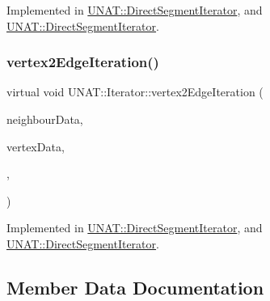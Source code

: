 Implemented in \mbox{\hyperlink{classUNAT_1_1DirectSegmentIterator_a6f53d346ec280ecfc3acf82691f6eaea}{U\+N\+A\+T\+::\+Direct\+Segment\+Iterator}}, and \mbox{\hyperlink{classUNAT_1_1DirectSegmentIterator_ac802bc1237356604a14c3349d6bf8d29}{U\+N\+A\+T\+::\+Direct\+Segment\+Iterator}}.

\mbox{\label{classUNAT_1_1Iterator_a0bb9f9c408c19b3c6bb342d37b333a1c}} 
\subsubsection{\texorpdfstring{vertex2EdgeIteration()}{vertex2EdgeIteration()}\hspace{0.1cm}{\footnotesize\ttfamily [2/2]}}
{\footnotesize\ttfamily virtual void U\+N\+A\+T\+::\+Iterator\+::vertex2\+Edge\+Iteration (\begin{DoxyParamCaption}\item[{\mbox{\hyperlink{structArrays}{Arrays}} $\ast$}]{neighbour\+Data,  }\item[{\mbox{\hyperlink{structArrays}{Arrays}} $\ast$}]{vertex\+Data,  }\item[{\mbox{\hyperlink{test_2directSegment_2iterator_8h_a15a4eedea7b94460153f0a0924c98224}{v2e\+\_\+host\+Fun\+Ptr}}}]{,  }\item[{\mbox{\hyperlink{test_2directSegment_2iterator_8h_acd8809485e3b16adfce1d459f3372671}{v2e\+\_\+slave\+Fun\+Ptr}}}]{ }\end{DoxyParamCaption})\hspace{0.3cm}{\ttfamily [pure virtual]}}



Implemented in \mbox{\hyperlink{classUNAT_1_1DirectSegmentIterator_a6f53d346ec280ecfc3acf82691f6eaea}{U\+N\+A\+T\+::\+Direct\+Segment\+Iterator}}, and \mbox{\hyperlink{classUNAT_1_1DirectSegmentIterator_ac802bc1237356604a14c3349d6bf8d29}{U\+N\+A\+T\+::\+Direct\+Segment\+Iterator}}.



\subsection{Member Data Documentation}
\mbox{\label{classUNAT_1_1Iterator_ac047c3fcc34d74653bf8c9b84259362a}} 
